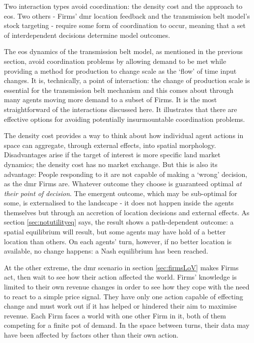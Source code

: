 Two interaction types avoid coordination: the density cost and the approach to \gls{eos}. Two others - Firms' \gls{dmr} location feedback and the transmission belt model's stock targeting - require some form of coordination to occur, meaning that a set of interdependent decisions determine model outcomes.

The \gls{eos} dynamics of the transmission belt model, as mentioned in the previous section, avoid coordination problems by allowing demand to be met while providing a method for production to change scale as the `flow' of time input changes. It is, technically, a point of interaction: the change of production scale is essential for the transmission belt mechanism and this comes about through many agents moving more demand to a subset of Firms. It is the most straightforward of the interactions discussed here. It illustrates that there are effective options for avoiding potentially insurmountable coordination problems.

The density cost provides a way to think about how individual agent actions in space can aggregate, through external effects, into spatial morphology. Disadvantages arise if the target of interest is more specific land market dynamics; the density cost has no market exchange. But this is also its advantage: People responding to it are not capable of making a `wrong' decision, as the \gls{dmr} Firms are. Whatever outcome they choose is guaranteed optimal \emph{at their point of decision}. The emergent outcome, which may be sub-optimal for some, is externalised to the landscape - it does not happen inside the agents themselves but through an accretion of location decisions and external effects. As section \ref{sec:notutilityeq} says, the result shows a path-dependent outcome: a spatial equilibrium will result, but some agents may have hold of a better location than others. On each agents' turn, however, if no better location is available, no change happens: a Nash equilibrium has been reached. 

At the other extreme, the \gls{dmr} scenario in section \ref{sec:firmsLoV} makes  Firms act, then wait to see how their action affected the world. Firms' knowledge is limited to their own revenue changes in order to see how they cope with the need to react to a simple price signal. They have only one action capable of effecting change and must work out if it has helped or hindered their aim to maximise revenue. Each Firm faces a world with one other Firm in it, both of them competing for a finite pot of demand. In the space between turns, their data may have been affected by factors other than their own action. 

